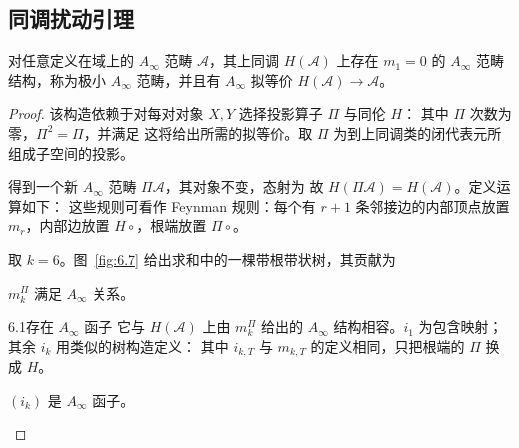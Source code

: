 \subsection{同调扰动引理}
\begin{theorem}\label{thm:6.1}
对任意定义在域上的 $A_\infty$ 范畴 $\mathcal A$，其上同调 $H(\mathcal A)$ 上存在 $m_1=0$ 的 $A_\infty$ 范畴结构，称为极小 $A_\infty$ 范畴，并且有 $A_\infty$ 拟等价 $H(\mathcal A)\to\mathcal A$。
\end{theorem}
\begin{proof}
该构造依赖于对每对对象 $X,Y$ 选择投影算子 $\Pi$ 与同伦 $H$：
其中 $\Pi$ 次数为零，$\Pi^2=\Pi$，并满足
这将给出所需的拟等价。取 $\Pi$ 为到上同调类的闭代表元所组成子空间的投影。

得到一个新 $A_\infty$ 范畴 $\Pi\mathcal A$，其对象不变，态射为
故 $H(\Pi\mathcal A)=H(\mathcal A)$。定义运算如下：
这些规则可看作 Feynman 规则：每个有 $r+1$ 条邻接边的内部顶点放置 $m_r$，内部边放置 $H\circ$，根端放置 $\Pi\circ$。
\begin{example}\label{ex:6.3}
取 $k=6$。图~\ref{fig:6.7} 给出求和中的一棵带根带状树，其贡献为
\end{example}
\begin{lemma}\label{lem:6.2}
$m_k^\Pi$ 满足 $A_\infty$ 关系。
\end{lemma}
\begin{Note}{6.1}存在 $A_\infty$ 函子
它与 $H(\mathcal A)$ 上由 $m_k^\Pi$ 给出的 $A_\infty$ 结构相容。$i_1$ 为包含映射；其余 $i_k$ 用类似的树构造定义：
其中 $i_{k,T}$ 与 $m_{k,T}$ 的定义相同，只把根端的 $\Pi$ 换成 $H$。
\end{Note}
\begin{lemma}\label{lem:6.3}
$(i_k)$ 是 $A_\infty$ 函子。
\end{lemma}
\end{proof}
